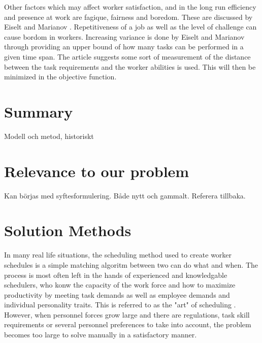 Other factors which may affect worker satisfaction, and in the long run efficiency and presence at work are fagique, fairness and boredom. These are discussed by Eiselt and Marianov \citet{eiselt_2006}. Repetitiveness of a job as well as the level of challenge can cause bordom in workers. Increasing variance is done by Eiselt and Marianov through providing an upper bound of how many tasks can be performed in a given time span. The article suggests some sort of measurement of the distance between the task requirements and the worker abilities is used. This will then be minimized in the objective function.


%
%
%



\section{Summary}
Modell och metod, historiskt

\section{Relevance to our problem}
Kan börjas med syftesformulering. Både nytt och gammalt. Referera tillbaka.


\section{Solution Methods}

In many real life situations, the scheduling method used to create worker schedules is a simple matching algoritm between two can do what and when. The process is most often left in the hands of experienced and knowledgable schedulers, who konw the capacity of the work force and how to maximize productivity by meeting task demands as well as employee demands and individual personality traits. This is referred to as the "art" of scheduling \citet{roberts_1983}. However, when personnel forces grow large and there are regulations, task skill requirements or several personnel preferences to take into account, the problem becomes too large to solve manually in a satisfactory manner.

